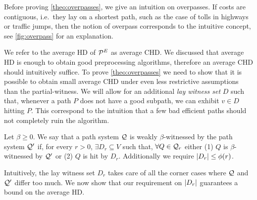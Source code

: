 Before proving \cref{theo:overpasses}, we give an intuition on overpasses.
If costs are contiguous, i.e.\ they lay on a shortest path, such as the case of tolls in highways or traffic jumps, then the notion of overpass corresponds to the intuitive concept, see \cref{fig:overpass} for an explanation.

We refer to the average HD of $\mathcal{P}^E$ as average CHD.
We discussed that average HD is enough to obtain good preprocessing algorithms, therefore an average CHD should intuitively suffice.
To prove \cref{theo:overpasses} we  need to show that it is possible to obtain small average CHD under even less restrictive assumptions than the partial-witness.
We will allow for an additional \emph{lay witness set} $D$ such that, whenever a path $P$ does not have a good subpath, we can exhibit $v\in D$ hitting $P$.
This correspond to the intuition that a few bad efficient paths should not completely ruin the algorithm. 

\begin{definition}
Let $\beta\geq 0$.
We say that a path system  $\mathcal{Q}$ is weakly $\beta$-witnessed by the path system $\mathcal{Q}'$ if, for every $r>0$, $\exists D_r\subseteq V$ such that, $\forall Q\in \mathcal{Q}_r$ either (1) $Q$ is $\beta$-witnessed by $\mathcal{Q}'$ or (2) $Q$ is hit by $D_r$.
Additionally we require $\lvert D_r\rvert\leq \phi(r)$.
\end{definition} 

Intuitively, the lay witness set $D_r$ takes care of all the corner cases where $\mathcal{Q}$ and $\mathcal{Q}'$ differ too much.
We now show that our requirement on $\lvert D_r\rvert$ guarantees a bound on the average HD.

